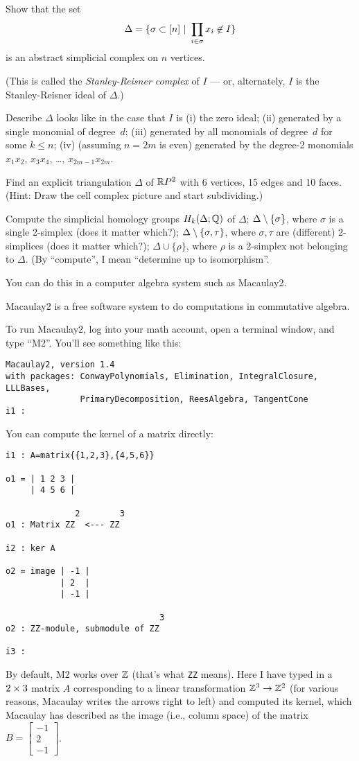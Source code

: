 \probpart  Show that the set
  $$\Delta=\{\sigma\subset[n] ~|~ \prod_{i\in\sigma} x_i\not\in I\}$$
is an abstract simplicial complex on $n$ vertices.

(This is called the
\emph{Stanley-Reisner complex} of $I$ --- or, alternately, $I$ is the 
Stanley-Reisner ideal of $\Delta$.)

\probpart  Describe  $\Delta$
looks like in the case 
that $I$ is (i) the zero ideal; (ii) generated by a single monomial
of degree~$d$; (iii) generated by all monomials of degree~$d$ for some $k\leq n$;
(iv) (assuming $n=2m$ is even) generated by the degree-2 monomials $x_1x_2$,
$x_3x_4$, \dots, $x_{2m-1}x_{2m}$.


\prob Find an explicit triangulation $\Delta$ of $\mathbb{R} P^2$ with
6 vertices, 15 edges and 10 faces.  (Hint: Draw the cell complex
picture and start subdividing.)

Compute the simplicial homology groups $H_k(\Delta;\mathbb{Q})$ of
\bang $\Delta$;
\bang $\Delta\setminus\{\sigma\}$, where $\sigma$ is a single 2-simplex (does 
it matter which?);
\bang $\Delta\setminus\{\sigma,\tau\}$, where $\sigma,\tau$ are (different) 
2-simplices (does it matter which?);
\bang $\Delta\cup\{\rho\}$, where $\rho$ is a 2-simplex not belonging to $\Delta$.
(By ``compute'', I mean ``determine up to isomorphism''.

You can do this in a computer algebra system such as Macaulay2.

\pagebreak

Macaulay2 is a free software system to do computations in commutative algebra.

To run Macaulay2, log into your math account,
open a terminal window, and type ``M2''.  You'll see something like this:
\begin{verbatim}
Macaulay2, version 1.4
with packages: ConwayPolynomials, Elimination, IntegralClosure, LLLBases,
               PrimaryDecomposition, ReesAlgebra, TangentCone
i1 : 
\end{verbatim}
You can compute the kernel of a matrix directly:
\begin{verbatim}
i1 : A=matrix{{1,2,3},{4,5,6}}

o1 = | 1 2 3 |
     | 4 5 6 |

              2        3
o1 : Matrix ZZ  <--- ZZ

i2 : ker A

o2 = image | -1 |
           | 2  |
           | -1 |

                               3
o2 : ZZ-module, submodule of ZZ

i3 : 
\end{verbatim}
By default, M2 works over $\mathbb{Z}$ (that's what \texttt{ZZ} means).
Here I have typed in a $2\times3$ matrix $A$ corresponding
to a linear transformation $\mathbb{Z}^3\to\mathbb{Z}^2$ (for various reasons,
Macaulay writes the arrows right to left) and computed
its kernel, which Macaulay has described as the image (i.e.,
column space) of the matrix $B=\begin{bmatrix}-1\\2\\-1\end{bmatrix}$.

